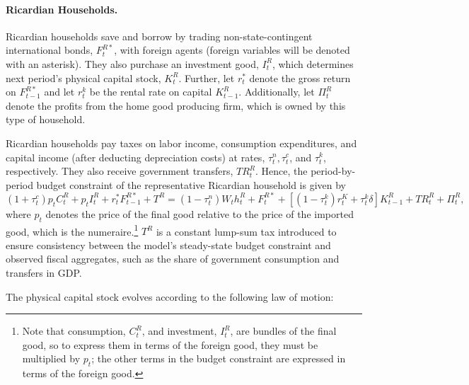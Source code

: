 \documentclass[12pt]{article}
\begin{document}
\paragraph{Ricardian Households.}

Ricardian households save and borrow by trading non-state-contingent international bonds, $F_{t}^{R\ast }$, with foreign agents (foreign variables will be denoted with an asterisk). They also purchase an investment good, $I^R_{t}$, which determines next period's physical capital stock, $K^R_{t}$. Further, let $r_{t}^{\ast }$ denote the gross return on $F_{t-1}^{R\ast }$ and let $r_t^k$ be the rental rate on capital $K_{t-1}^R$. Additionally, let $\Pi_t^R$ denote the profits from the home good producing firm, which is owned by this type of household.

Ricardian households pay taxes on labor income, consumption expenditures, and capital income (after deducting depreciation costs) at rates, $\tau^n_t, \tau^c_t$, and $\tau^k_t$, respectively. They also receive government transfers, $TR^R_t$. Hence, the period-by-period budget constraint of the representative Ricardian household is given by%
\begin{equation}
(1+\tau^c_t)p_tC^R_{t}+p_tI^R_{t} +r_{t}^{\ast}F^{R\ast}_{t-1} + T^R 
=(1-\tau^n_t)W_{t}h^R_{t}+F^{R*}_t+ \left[(1-\tau^k_t)r_{t}^{K}+\tau^k_t\delta \right]K^R_{t-1} + TR^R_t + \Pi_t^R, %
\label{eq:Households_3}
\end{equation}%
where $p_t$ denotes the price of the final good relative to the price of the imported good, which is the numeraire.\footnote{Note that consumption, $C_t^R$, and investment, $I_t^R$, are bundles of the final good, so to express them in terms of the foreign good, they must be multiplied by $p_t$; the other terms in the budget constraint are expressed in terms of the foreign good.} $T^R$ is a constant lump-sum tax introduced to ensure consistency between the model’s steady-state budget constraint and observed fiscal aggregates, such as the share of government consumption and transfers in GDP.

The physical capital stock evolves according to the following law of motion:
\end{document}
